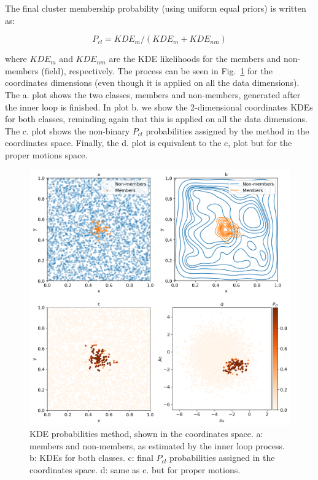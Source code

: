 \documentclass{aa}
\begin{document}
 The final cluster membership probability (using uniform equal priors) is
 written as:

 \begin{equation}
 P_{cl} = KDE_{m} / (KDE_{m} + KDE_{nm})
 \end{equation}

 \noindent where $KDE_{m}$ and $KDE_{nm}$ are the KDE likelihoods for the
 members and non-members (field), respectively. The process can be seen in
 Fig.~\ref{fig:KDE} for the coordinates dimensions (even though it is applied
 on all the data dimensions). The a. plot shows the two classes, members and
 non-members, generated after the inner loop is finished. In plot b. we show
 the 2-dimensional coordinates KDEs for both classes, reminding again that this
 is applied on all the data dimensions. The c. plot shows the
 non-binary $P_{cl} $ probabilities assigned by the method in the coordinates
 space. Finally, the d. plot is equivalent to the c, plot but for the proper
 motions space.
 
  \begin{figure}
  \includegraphics[width=\hsize]{figs/KDE.png}
  \caption{KDE probabilities method, shown in the coordinates space. a:
  members and non-members, as estimated by the inner loop process. b:
  KDEs for both classes. c: final $P_{cl} $ probabilities assigned in the
  coordinates space. d: same as c. but for proper motions.}
  \label{fig:KDE}
  \end{figure}
\end{document}
